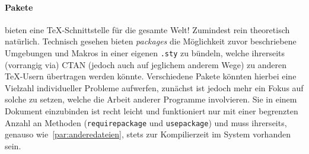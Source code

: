 \paragraph*{Pakete} bieten eine \TeX{}-Schnittstelle für die gesamte Welt! Zumindest rein theoretisch natürlich. Technisch gesehen bieten \textit{packages} die Möglichkeit zuvor beschriebene Umgebungen und Makros in einer eigenen \texttt{.sty} zu bündeln, welche ihrerseits (vorrangig via) CTAN (jedoch auch auf jeglichem anderem Wege) zu anderen \TeX{}-Usern übertragen werden könnte. Verschiedene Pakete könnten hierbei eine Vielzahl individueller Probleme aufwerfen, zunächst ist jedoch mehr ein Fokus auf solche zu setzen, welche die Arbeit anderer Programme involvieren. Sie in einem Dokument einzubinden ist recht leicht und funktioniert nur mit einer begrenzten Anzahl an Methoden (\texttt{requirepackage} und \texttt{usepackage}) und muss ihrerseits, genauso wie~\ref{par:anderedateien}, stets zur Kompilierzeit im System vorhanden sein. 

